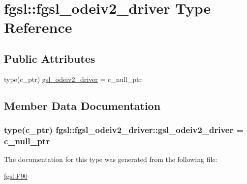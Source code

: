 \hypertarget{structfgsl_1_1fgsl__odeiv2__driver}{}\section{fgsl\+:\+:fgsl\+\_\+odeiv2\+\_\+driver Type Reference}
\label{structfgsl_1_1fgsl__odeiv2__driver}
\subsection*{Public Attributes}
\begin{DoxyCompactItemize}
\item 
type(c\+\_\+ptr) \hyperlink{structfgsl_1_1fgsl__odeiv2__driver_a76935e00c460e2c2a4235f6c7d653f1b}{gsl\+\_\+odeiv2\+\_\+driver} = c\+\_\+null\+\_\+ptr
\end{DoxyCompactItemize}


\subsection{Member Data Documentation}
\hypertarget{structfgsl_1_1fgsl__odeiv2__driver_a76935e00c460e2c2a4235f6c7d653f1b}{}
\subsubsection[{gsl\+\_\+odeiv2\+\_\+driver}]{\setlength{\rightskip}{0pt plus 5cm}type(c\+\_\+ptr) fgsl\+::fgsl\+\_\+odeiv2\+\_\+driver\+::gsl\+\_\+odeiv2\+\_\+driver = c\+\_\+null\+\_\+ptr}\label{structfgsl_1_1fgsl__odeiv2__driver_a76935e00c460e2c2a4235f6c7d653f1b}


The documentation for this type was generated from the following file\+:\begin{DoxyCompactItemize}
\item 
\hyperlink{fgsl_8F90}{fgsl.\+F90}\end{DoxyCompactItemize}
